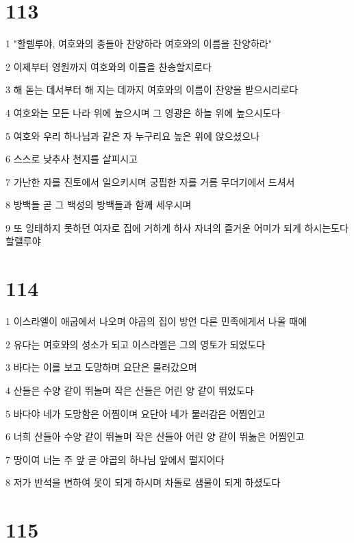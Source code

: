 \chapter{113}

\par 1 "할렐루야, 여호와의 종들아 찬양하라 여호와의 이름을 찬양하라"
\par 2 이제부터 영원까지 여호와의 이름을 찬송할지로다
\par 3 해 돋는 데서부터 해 지는 데까지 여호와의 이름이 찬양을 받으시리로다
\par 4 여호와는 모든 나라 위에 높으시며 그 영광은 하늘 위에 높으시도다
\par 5 여호와 우리 하나님과 같은 자 누구리요 높은 위에 앉으셨으나
\par 6 스스로 낮추사 천지를 살피시고
\par 7 가난한 자를 진토에서 일으키시며 궁핍한 자를 거름 무더기에서 드셔서
\par 8 방백들 곧 그 백성의 방백들과 함께 세우시며
\par 9 또 잉태하지 못하던 여자로 집에 거하게 하사 자녀의 즐거운 어미가 되게 하시는도다 할렐루야

\chapter{114}

\par 1 이스라엘이 애굽에서 나오며 야곱의 집이 방언 다른 민족에게서 나올 때에
\par 2 유다는 여호와의 성소가 되고 이스라엘은 그의 영토가 되었도다
\par 3 바다는 이를 보고 도망하며 요단은 물러갔으며
\par 4 산들은 수양 같이 뛰놀며 작은 산들은 어린 양 같이 뛰었도다
\par 5 바다야 네가 도망함은 어찜이며 요단아 네가 물러감은 어찜인고
\par 6 너희 산들아 수양 같이 뛰놀며 작은 산들아 어린 양 같이 뛰놂은 어찜인고
\par 7 땅이여 너는 주 앞 곧 야곱의 하나님 앞에서 떨지어다
\par 8 저가 반석을 변하여 못이 되게 하시며 차돌로 샘물이 되게 하셨도다

\chapter{115}

